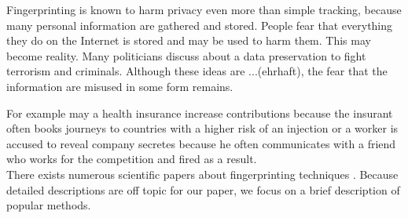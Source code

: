 	Fingerprinting is known to harm privacy even more than simple tracking, because many personal information are gathered and stored. People fear that everything they do on the Internet is stored and may be used to harm them. This may become reality. Many politicians discuss about a data preservation to fight terrorism and criminals. Although these ideas are ...(ehrhaft), the fear that the information are misused in some form remains.
	
	For example may a health insurance increase contributions because the insurant often books journeys to countries with a higher risk of an injection or a worker is accused to reveal company secretes because he often communicates with a friend who works for the competition and fired as a result. \\
	
	
	
	
	There exists numerous scientific papers about fingerprinting techniques \cite{paulstone_historysniffing, MBYS11, Nikiforakis:2013:CME:2497621.2498133, Eckersley:2010:UYW:1881151.1881152, MS12, olejnik:hal-00747841}. Because detailed descriptions are off topic for our paper, we focus on a brief description of popular methods. 
	

